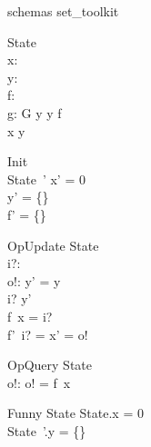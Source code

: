 \documentclass{article}
\begin{document}
\begin{zsection}
\SECTION schemas \parents set\_toolkit
\end{zsection}

\begin{zed}
   [G]
\end{zed}

\begin{schema}{State}
\zstate \\
   x: \nat \\
   y: \power~\nat \\
   f: \nat \fun \nat \\
   g: G
\where
   y \cross y \subseteq f \\
   x \in y
\end{schema}

\begin{schema}{Init}
\zstinit\\
   State~'
\where
   x' = 0 \\
   y' = \{\} \\
   f' = \{\}
\end{schema}

\begin{schema}{OpUpdate}
   \Delta State \\
   i?: \nat \\
   o!: \nat
\where
   y' = y \\
   i? \in y' \\
   f~x = i? \\
   f'~i? = x' = o!
\end{schema}

\begin{schema}{OpQuery}
  \Xi State \\
  o!: \nat
\where
   o! = f~x
\end{schema}

\begin{schema}{Funny}
   \Delta State
\where
   \theta State.x = 0 \\
   \theta State~'.y = \{\} 
\end{schema}
\end{document}
